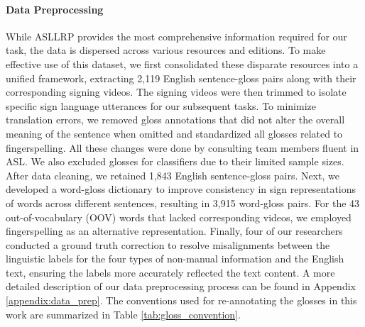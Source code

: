 \paragraph{Data Preprocessing} While ASLLRP provides the most comprehensive information required for our task, the data is dispersed across various resources and editions. To make effective use of this dataset, we first consolidated these disparate resources into a unified framework, extracting 2,119 English sentence-gloss pairs along with their corresponding signing videos. The signing videos were then trimmed to isolate specific sign language utterances for our subsequent tasks. To minimize translation errors, we removed gloss annotations that did not alter the overall meaning of the sentence when omitted and standardized all glosses related to fingerspelling. All these changes were done by consulting team members fluent in ASL. We also excluded glosses for classifiers due to their limited sample sizes. After data cleaning, we retained 1,843 English sentence-gloss pairs. Next, we developed a word-gloss dictionary to improve consistency in sign representations of words across different sentences, resulting in 3,915 word-gloss pairs. For the 43 out-of-vocabulary (OOV) words that lacked corresponding videos, we employed fingerspelling as an alternative representation. Finally, four of our researchers conducted a ground truth correction to resolve misalignments between the linguistic labels for the four types of non-manual information and the English text, ensuring the labels more accurately reflected the text content. A more detailed description of our data preprocessing process can be found in Appendix \ref{appendix:data_prep}. The conventions used for re-annotating the glosses in this work are summarized in Table \ref{tab:gloss_convention}.




